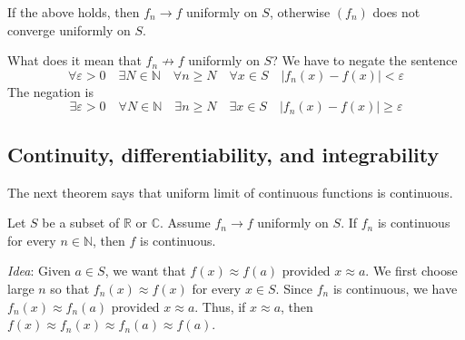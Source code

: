 \documentclass[a4paper]{article}
\begin{document}
If the above holds, then $f_{n} \rightarrow f$ uniformly on $S$, otherwise $\left(f_{n}\right)$ does not converge uniformly on $S$.

\begin{remark}
    What does it mean that $f_{n} \not \rightarrow f$ uniformly on $S$? We have to negate the sentence
    \[
    \forall \varepsilon>0 \quad \exists N \in \mathbb{N} \quad \forall n \geqslant N \quad \forall x \in S \quad\left|f_{n}(x)-f(x)\right|<\varepsilon
    \]
    The negation is
    \[
    \exists \varepsilon>0 \quad \forall N \in \mathbb{N} \quad \exists n \geqslant N \quad \exists x \in S \quad\left|f_{n}(x)-f(x)\right| \geqslant \varepsilon
    \]
\end{remark}

\subsection{Continuity, differentiability, and integrability}

The next theorem says that uniform limit of continuous functions is continuous.
\begin{theorem}\label{thm:1}
    Let $S$ be a subset of $\mathbb{R}$ or $\mathbb{C}$. Assume $f_{n} \rightarrow f$ uniformly on $S$. If $f_{n}$ is continuous for every $n \in \mathbb{N}$, then $f$ is continuous.
\end{theorem}
\textit{Idea}: Given $a \in S$, we want that $f(x) \approx f(a)$ provided $x \approx a$. We first choose large $n$ so that $f_{n}(x) \approx f(x)$ for every $x \in S$. Since $f_{n}$ is continuous, we have $f_{n}(x) \approx f_{n}(a)$ provided $x \approx a$. Thus, if $x \approx a$, then $f(x) \approx f_{n}(x) \approx f_{n}(a) \approx f(a)$.
\end{document}
